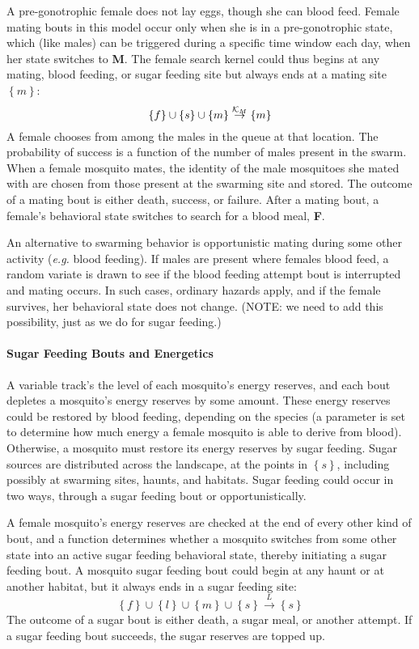 \documentclass{article}
\newcommand{\eg}{{\em e.g. }}
\begin{document}
A pre-gonotrophic female does not lay eggs, though she can blood feed. Female mating bouts in this model occur only when she is in a pre-gonotrophic state, which (like males) can be triggered during a specific time window each day, when her state switches to {\bf M}. The female search kernel could thus begins at any mating, blood feeding, or sugar feeding site but always ends at a mating site $\left\{ m\right\} $:
%
\begin{equation}
%
\left\{ f\right\} \cup \left\{ s\right\} \cup \left\{ m\right\}  \overset{{\cal K}_M}{\rightarrow} \left\{ m\right\} 
%
\end{equation}
%
A female chooses from among the males in the queue at that location. The probability of success is a function of the number of males present in the swarm. When a female mosquito mates, the identity of the male mosquitoes she mated with are chosen from those present at the swarming site and stored. The outcome of a mating bout is either death, success, or failure. After a mating bout, a female's behavioral state switches to search for a blood meal, {\bf F}. 

An alternative to swarming behavior is opportunistic mating during some other activity (\eg blood feeding). If males are present where females blood feed, a random variate is drawn to see if the blood feeding attempt bout is interrupted and mating occurs. In such cases, ordinary hazards apply, and if the female survives, her behavioral state does not change. (NOTE: we need to add this possibility, just as we do for sugar feeding.)  

\paragraph{Sugar Feeding Bouts and Energetics}

A variable track's the level of each mosquito's energy reserves, and each bout depletes a mosquito's energy reserves by some amount. These energy reserves could be restored by blood feeding, depending on the species (a parameter is set to determine how much energy a female mosquito is able to derive from blood). Otherwise, a mosquito must restore its energy reserves by sugar feeding. Sugar sources are distributed across the landscape, at the points in $\left\{ s\right\} $, including possibly at swarming sites, haunts, and habitats. Sugar feeding could occur in two ways, through a sugar feeding bout or opportunistically.

A female mosquito's energy reserves are checked at the end of every other kind of bout, and a function determines whether a mosquito switches from some other state into an active sugar feeding behavioral state, thereby initiating a sugar feeding bout. A mosquito sugar feeding bout could begin at any haunt or at another habitat, but it always ends in a sugar feeding site:
%
\begin{equation}
%
\left\{ f\right\} \cup \left\{ l\right\}  \cup \left\{ m\right\}  \cup \left\{ s\right\}  \overset{L}{\rightarrow} \left\{ s\right\} 
%
\end{equation}
%
The outcome of a sugar bout is either death, a sugar meal, or another attempt. If a sugar feeding bout succeeds, the sugar reserves are topped up. 
\end{document}
